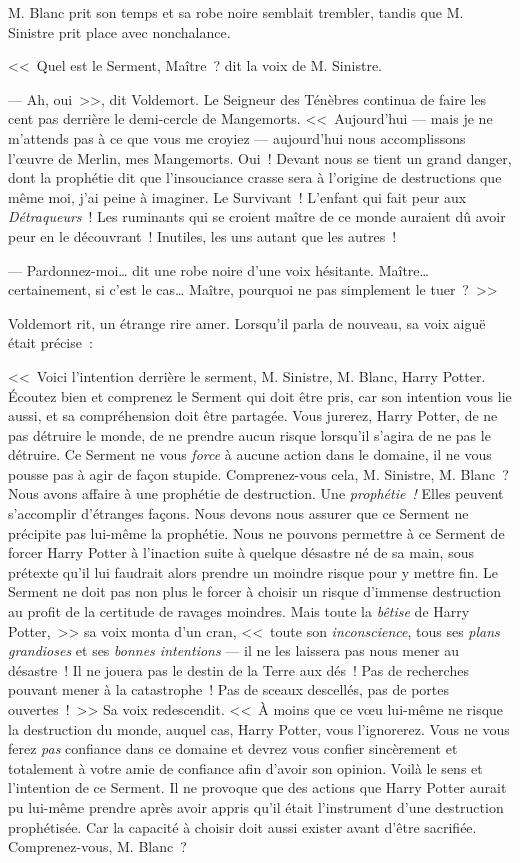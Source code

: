 M. Blanc prit son temps et sa robe noire semblait trembler, tandis que M. Sinistre prit place avec nonchalance.

<<~Quel est le Serment, Maître~? dit la voix de M. Sinistre.

--- Ah, oui~>>, dit Voldemort. Le Seigneur des Ténèbres continua de faire les cent pas derrière le demi-cercle de Mangemorts. <<~Aujourd'hui — mais je ne m'attends pas à ce que vous me croyiez — aujourd'hui nous accomplissons l'œuvre de Merlin, mes Mangemorts. Oui~! Devant nous se tient un grand danger, dont la prophétie dit que l'insouciance crasse sera à l'origine de destructions que même moi, j'ai peine à imaginer. Le Survivant~! L'enfant qui fait peur aux \emph{Détraqueurs}~! Les ruminants qui se croient maître de ce monde auraient dû avoir peur en le découvrant~! Inutiles, les uns autant que les autres~!

--- Pardonnez-moi… dit une robe noire d'une voix hésitante. Maître… certainement, si c'est le cas… Maître, pourquoi ne pas simplement le tuer~?~>>

Voldemort rit, un étrange rire amer. Lorsqu'il parla de nouveau, sa voix aiguë était précise~:

<<~Voici l'intention derrière le serment, M. Sinistre, M. Blanc, Harry Potter. Écoutez bien et comprenez le Serment qui doit être pris, car son intention vous lie aussi, et sa compréhension doit être partagée. Vous jurerez, Harry Potter, de ne pas détruire le monde, de ne prendre aucun risque lorsqu'il s'agira de ne pas le détruire. Ce Serment ne vous \emph{force} à aucune action dans le domaine, il ne vous pousse pas à agir de façon stupide. Comprenez-vous cela, M. Sinistre, M. Blanc~? Nous avons affaire à une prophétie de destruction. Une \emph{prophétie~!} Elles peuvent s'accomplir d'étranges façons. Nous devons nous assurer que ce Serment ne précipite pas lui-même la prophétie. Nous ne pouvons permettre à ce Serment de forcer Harry Potter à l'inaction suite à quelque désastre né de sa main, sous prétexte qu'il lui faudrait alors prendre un moindre risque pour y mettre fin. Le Serment ne doit pas non plus le forcer à choisir un risque d'immense destruction au profit de la certitude de ravages moindres. Mais toute la \emph{bêtise} de Harry Potter,~>> sa voix monta d'un cran, <<~toute son \emph{inconscience}, tous ses \emph{plans grandioses} et ses \emph{bonnes intentions} — il ne les laissera pas nous mener au désastre~! Il ne jouera pas le destin de la Terre aux dés~! Pas de recherches pouvant mener à la catastrophe~! Pas de sceaux descellés, pas de portes ouvertes~!~>> Sa voix redescendit. <<~À moins que ce vœu lui-même ne risque la destruction du monde, auquel cas, Harry Potter, vous l'ignorerez. Vous ne vous ferez \emph{pas} confiance dans ce domaine et devrez vous confier sincèrement et totalement à votre amie de confiance afin d'avoir son opinion. Voilà le sens et l'intention de ce Serment. Il ne provoque que des actions que Harry Potter aurait pu lui-même prendre après avoir appris qu'il était l'instrument d'une destruction prophétisée. Car la capacité à choisir doit aussi exister avant d'être sacrifiée. Comprenez-vous, M. Blanc~?

